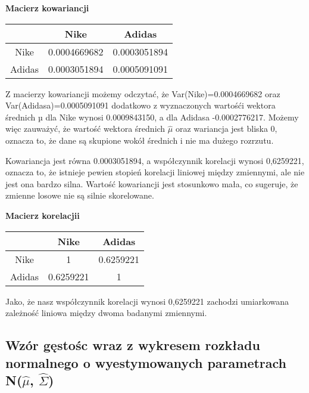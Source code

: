 \documentclass[a4paper,11pt]{article}
\begin{document}
\begin{center}
{\textbf{Macierz kowariancji}}\\
\begin{tabular}{ |c | c | c| } 
  \hline
    & Nike & Adidas   \\ 
  \hline
  Nike & 0.0004669682 & 0.0003051894\\ 
  \hline
  Adidas & 0.0003051894 & 0.0005091091\\
  \hline
\end{tabular}
\end{center}
{Z macierzy kowariancji możemy odczytać, że Var(Nike)=0.0004669682 oraz Var(Adidasa)=0.0005091091 dodatkowo z wyznaczonych wartośći wektora średnich µ dla Nike wynosi 0.0009843150, a dla Adidasa -0.0002776217. Możemy więc zauważyć, że wartość wektora średnich $\hat{\mu}$ oraz wariancja jest bliska 0, oznacza to, że dane są skupione wokół średnich i nie ma dużego rozrzutu.\newline }

 \begin{flushleft}


{Kowariancja jest równa 0.0003051894, a współczynnik korelacji wynosi 0,6259221, oznacza to, że istnieje pewien stopień korelacji liniowej między zmiennymi, ale nie jest ona bardzo silna. Wartość kowariancji jest stosunkowo mała, co sugeruje, że zmienne losowe nie są silnie skorelowane.}

\end{flushleft}


{}
\begin{center}
{\textbf{Macierz korelacjii}}\\
\begin{tabular}{ |c | c | c| } 
  \hline
    & Nike & Adidas   \\ 
  \hline
  Nike & 1 & 0.6259221\\ 
  \hline
  Adidas & 0.6259221 & 1\\
  \hline
\end{tabular}
\end{center}

\begin{flushleft}
{Jako, że  nasz współczynnik korelacji wynosi 0,6259221 zachodzi umiarkowana zależność liniowa między dwoma badanymi zmiennymi.}

\end{flushleft}



\subsection{Wzór gęstośc wraz  z wykresem rozkładu normalnego o wyestymowanych parametrach N($\hat{\mu}$, $\hat{\Sigma}$) }
\end{document}
